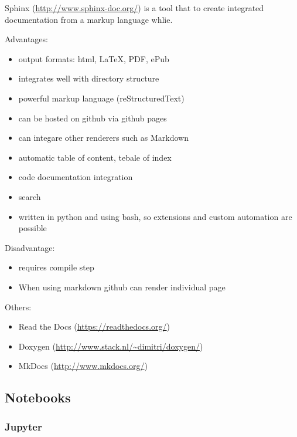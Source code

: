 Sphinx (\url{http://www.sphinx-doc.org/}) is a tool that to create
integrated documentation from a markup language whlie.

Advantages:

\begin{itemize}

\item
  output formats: html, LaTeX, PDF, ePub
\item
  integrates well with directory structure
\item
  powerful markup language (reStructuredText)
\item
  can be hosted on github via github pages
\item
  can integare other renderers such as Markdown
\item
  automatic table of content, tebale of index
\item
  code documentation integration
\item
  search
\item
  written in python and using bash, so extensions and custom automation
  are possible
\end{itemize}

Disadvantage:

\begin{itemize}

\item
  requires compile step
\item
  When using markdown github can render individual page
\end{itemize}

Others:

\begin{itemize}

\item
  Read the Docs (\url{https://readthedocs.org/})
\item
  Doxygen (\url{http://www.stack.nl/~dimitri/doxygen/})
\item
  MkDocs (\url{http://www.mkdocs.org/})
\end{itemize}

\subsection{Notebooks}\label{notebooks}

\subsubsection{Jupyter}\label{jupyter}

